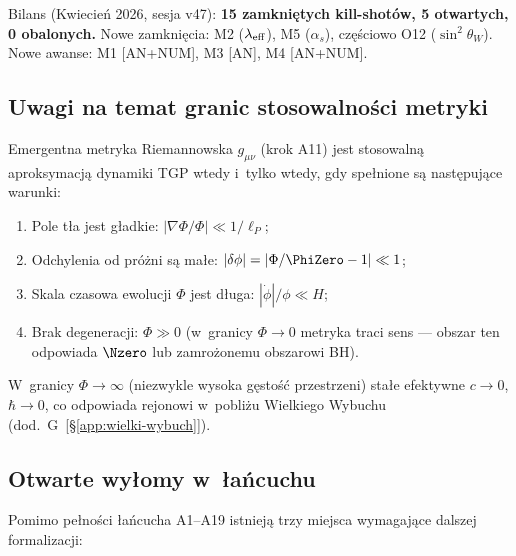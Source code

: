 \noindent Bilans (Kwiecie\'n 2026, sesja v47):
\textbf{15 zamkni\k{e}tych kill-shot\'ow, 5 otwartych, 0 obalonych.}
Nowe zamkni\k{e}cia: M2 ($\lambda_{\rm eff}$), M5 ($\alpha_s$),
cz\k{e}\'sciowo O12 ($\sin^2\theta_W$).
Nowe awanse: M1 [AN+NUM], M3 [AN], M4 [AN+NUM].

\subsection{Uwagi na temat granic stosowalności metryki}\label{app:H-granice}

\begin{remark}\label{rem:H-metric-domain}
  Emergentna metryka Riemannowska $g_{\mu\nu}$ (krok A11)
  jest stosowaln\k{a} aproksymacj\k{a} dynamiki TGP wtedy
  i~tylko wtedy, gdy spe\l{}nione s\k{a} nast\k{e}puj\k{a}ce
  warunki:
  \begin{enumerate}[nosep,label=(\roman*)]
    \item Pole t\l{}a jest g\l{}adkie: $|\nabla\Phi / \Phi| \ll 1/\ell_P$;
    \item Odchylenia od pr\'o\.zni s\k{a} ma\l{}e:
          $|\delta\phi| = |\Phi/\PhiZero - 1| \ll 1$;
    \item Skala czasowa ewolucji $\Phi$ jest d\l{}uga: $|\dot\phi|/\phi \ll H$;
    \item Brak degeneracji: $\Phi \gg 0$
          (w~granicy $\Phi \to 0$ metryka traci sens --- obszar ten
          odpowiada $\Nzero$ lub zamro\.zonemu obszarowi BH).
  \end{enumerate}
  W~granicy $\Phi \to \infty$ (niezwykle wysoka g\k{e}sto\'s\'c
  przestrzeni) sta\l{}e efektywne $c \to 0$, $\hbar \to 0$,
  co odpowiada rejonowi w~pobli\.zu Wielkiego Wybuchu
  (dod.~G~[\S\ref{app:wielki-wybuch}]).
\end{remark}

\subsection{Otwarte wy\l{}omy w~\l{}a\'ncuchu}\label{app:H-luki}

Pomimo pe\l{}no\'sci \l{}a\'ncucha A1--A19 istniej\k{a} trzy miejsca
wymagaj\k{a}ce dalszej formalizacji:

